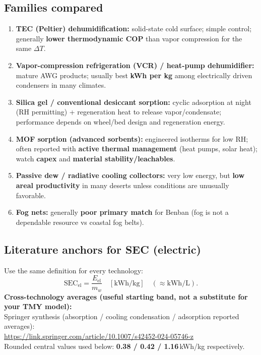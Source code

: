 \documentclass[11pt,a4paper]{article}
\begin{document}
\subsection{Families compared}
\begin{enumerate}[leftmargin=*]
  \item \textbf{TEC (Peltier) dehumidification:} solid-state cold surface; simple control; generally \textbf{lower thermodynamic COP} than vapor compression for the same $\Delta T$.
  \item \textbf{Vapor-compression refrigeration (VCR) / heat-pump dehumidifier:} mature AWG products; usually best \textbf{kWh per kg} among electrically driven condensers in many climates.
  \item \textbf{Silica gel / conventional desiccant sorption:} cyclic adsorption at night (RH permitting) + regeneration heat to release vapor/condensate; performance depends on wheel/bed design and regeneration energy.
  \item \textbf{MOF sorption (advanced sorbents):} engineered isotherms for low RH; often reported with \textbf{active thermal management} (heat pumps, solar heat); watch \textbf{capex} and \textbf{material stability/leachables}.
  \item \textbf{Passive dew / radiative cooling collectors:} very low energy, but \textbf{low areal productivity} in many deserts unless conditions are unusually favorable.
  \item \textbf{Fog nets:} generally \textbf{poor primary match} for Benban (fog is not a dependable resource vs coastal fog belts).
\end{enumerate}

\subsection{Literature anchors for SEC (electric)}
Use the same definition for every technology:
\begin{equation}
\mathrm{SEC}_{\mathrm{el}}=\frac{E_{\mathrm{el}}}{m_w}\quad[\mathrm{kWh/kg}]\quad(\approx \mathrm{kWh/L}).
\end{equation}
\textbf{Cross-technology averages (useful starting band, not a substitute for your TMY model):}\\
Springer synthesis (absorption / cooling condensation / adsorption reported averages):\\
\url{https://link.springer.com/article/10.1007/s42452-024-05746-z}\\
Rounded central values used below: \textbf{0.38 / 0.42 / 1.16}\,kWh/kg respectively.
\end{document}
